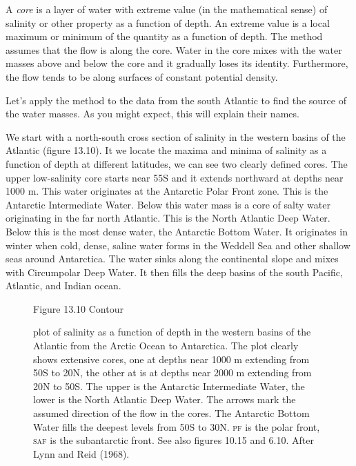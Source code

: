 A \textit{core} is a layer of water with extreme value (in the mathematical
sense) of salinity or other property as a function of depth. An extreme value is a local
maximum or minimum of the quantity as a function of depth. The method assumes that the flow is
along the core. Water in the core mixes with the water masses above and below the core and it
gradually loses its identity. Furthermore, the flow tends to be along surfaces of constant
potential density.

Let's apply the method to the data from the south Atlantic to find the source of the water
masses. As you might expect, this will explain their names.

We start with a north-south cross section of salinity in the western basins of the
Atlantic (figure 13.10). It we locate the maxima and minima of salinity as a function
of depth at different latitudes, we can see two clearly defined cores. The upper
low-salinity core starts near 55\degrees S and it extends northward at depths near
1000 m. This water originates at the Antarctic Polar Front zone. This is the Antarctic
Intermediate Water. Below this water mass is a core of salty water originating in the far north Atlantic. This is the North
Atlantic Deep Water. Below this is the most dense water, the Antarctic Bottom Water. It originates in winter when cold, dense, saline water forms in the Weddell Sea and
other shallow seas around Antarctica. The water sinks along the continental slope and
mixes with Circumpolar Deep Water. It then fills the deep basins of the south Pacific,
Atlantic, and Indian ocean.

\begin{figure}[t!]
\footnotesize
Figure 13.10 Contour \rule{0pt}{3ex}plot of salinity as a function of depth in the western
basins of the Atlantic from the Arctic Ocean to Antarctica. The plot clearly shows extensive
cores, one at depths near 1000 m extending from 50\degrees S to 20\degrees N, the other at is
at depths near 2000 m extending from 20\degrees N to 50\degrees S. The upper is the Antarctic
Intermediate Water, the lower is the North Atlantic Deep Water. The arrows mark the assumed
direction of the flow in the cores. The Antarctic Bottom Water
fills the deepest levels from 50\degrees S to 30\degrees N. \textsc{pf} is the polar front,
\textsc{saf} is the subantarctic front. See also figures 10.15 and 6.10. After Lynn and Reid (1968).
\label{fig:Cores}
\vspace{-3ex}
\end{figure}

